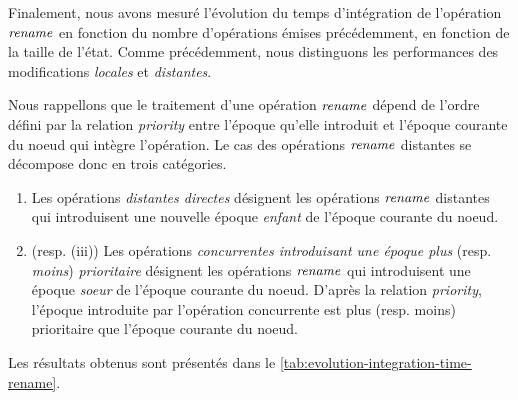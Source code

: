 \label{sec:integration-time-rename}

Finalement, nous avons mesuré l'évolution du temps d'intégration de l'opération $\mathit{rename}$ en fonction du nombre d'opérations émises précédemment, \ie en fonction de la taille de l'état.
Comme précédemment, nous distinguons les performances des modifications \emph{locales} et \emph{distantes}.

Nous rappellons que le traitement d'une opération $\mathit{rename}$ dépend de l'ordre défini par la relation \emph{priority} entre l'époque qu'elle introduit et l'époque courante du noeud qui intègre l'opération.
Le cas des opérations $\mathit{rename}$ distantes se décompose donc en trois catégories.
\begin{enumerate}
  \item Les opérations \emph{distantes directes} désignent les opérations $\mathit{rename}$ distantes qui introduisent une nouvelle époque \emph{enfant} de l'époque courante du noeud.
  \item (resp. (iii)) Les opérations \emph{concurrentes introduisant une époque plus} (resp. \emph{moins}) \emph{ prioritaire} désignent les opérations $\mathit{rename}$ qui introduisent une époque \emph{soeur} de l'époque courante du noeud.
  D'après la relation \emph{priority}, l'époque introduite par l'opération concurrente est plus (resp. moins) prioritaire que l'époque courante du noeud.
\end{enumerate}
Les résultats obtenus sont présentés dans le \autoref{tab:evolution-integration-time-rename}.

